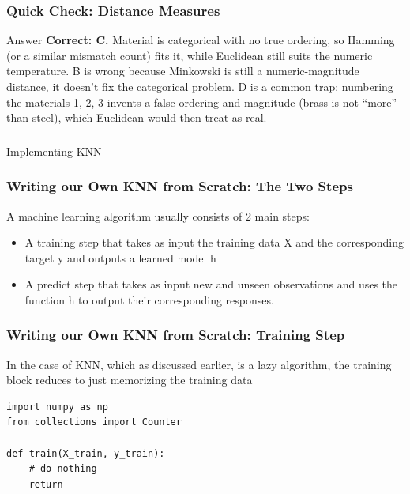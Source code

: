 \begin{frame}[fragile]\frametitle{Quick Check: Distance Measures}
\begin{block}{Answer}
\textbf{Correct: C.} Material is categorical with no true ordering, so Hamming (or a similar
mismatch count) fits it, while Euclidean still suits the numeric temperature. B is wrong
because Minkowski is still a numeric-magnitude distance, it doesn't fix the categorical
problem. D is a common trap: numbering the materials 1, 2, 3 invents a false ordering and
magnitude (brass is not ``more'' than steel), which Euclidean would then treat as real.
\end{block}
\end{frame}

\begin{frame}[fragile]\frametitle{}
\begin{center}
{\Large Implementing KNN}
\end{center}
\end{frame}


\begin{frame}[fragile]\frametitle{Writing our Own KNN from Scratch: The Two Steps}
A machine learning algorithm usually consists of 2 main steps:

\begin{itemize}
\item  A training step that takes as input the training data X and the corresponding target y and outputs a learned model h
\item A predict step that takes as input new and unseen observations and uses the function h
to output their corresponding responses.
\end{itemize}
\end{frame}

\begin{frame}[fragile]\frametitle{Writing our Own KNN from Scratch: Training Step}
In the case of KNN, which as discussed earlier, is a lazy algorithm, the training block reduces to just memorizing the training data
\begin{lstlisting}
import numpy as np
from collections import Counter

def train(X_train, y_train):
	# do nothing
	return
\end{lstlisting}
\end{frame}

